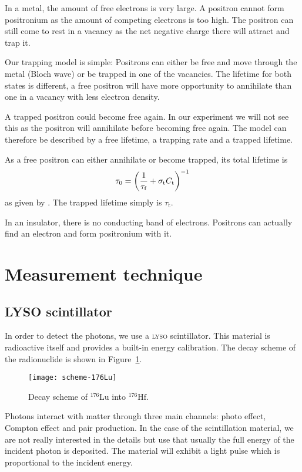 \documentclass[11pt, english, fleqn, DIV=15, headinclude, BCOR=2cm]{scrreprt}
\begin{document}
In a metal, the amount of free electrons is very large. A positron cannot form
positronium as the amount of competing electrons is too high. The positron can
still come to rest in a vacancy as the net negative charge there will attract
and trap it.

Our trapping model is simple: Positrons can either be free and move through the
metal (Bloch wave) or be trapped in one of the vacancies. The lifetime for both
states is different, a free positron will have more opportunity to annihilate
than one in a vacancy with less electron density.

A trapped positron could become free again. In our experiment we will not see
this as the positron will annihilate before becoming free again. The model can
therefore be described by a free lifetime, a trapping rate and a trapped
lifetime.

As a free positron can either annihilate or become trapped, its total lifetime
is
\[
    \tau_0 = \left( \frac{1}{\tau_\mathrm f} + \sigma_\mathrm t C_\mathrm t \right)^{-1}
\]
as given by \textcite[(1a)]{Weiler/Vacancy_formation}. The trapped lifetime
simply is $\tau_\mathrm t$.

In an insulator, there is no conducting band of electrons. Positrons can
actually find an electron and form positronium with it. 

\section{Measurement technique}

\subsection{LYSO scintillator}

In order to detect the photons, we use a \textsc{lyso} scintillator. This material is
radioactive itself and provides a built-in energy calibration. The decay scheme
of the radionuclide is shown in Figure~\ref{fig:scheme-176Lu}.

\begin{figure}
    \centering
    \texttt{[image: scheme-176Lu]}
    \caption{%
        Decay scheme of $^{176}\mathrm{Lu}$ into $^{176}\mathrm{Hf}$.
    }
    \label{fig:scheme-176Lu}
\end{figure}

Photons interact with matter through three main channels: photo effect, Compton
effect and pair production. In the case of the scintillation material, we are
not really interested in the details but use that usually the full energy of
the incident photon is deposited. The material will exhibit a light pulse which
is proportional to the incident energy.
\end{document}
